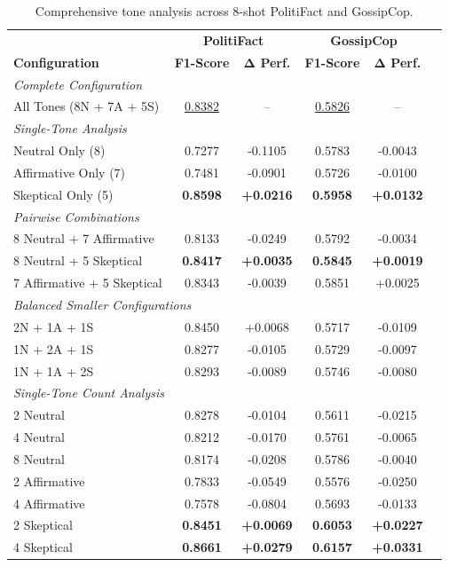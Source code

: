 \begin{table}[htbp]
\centering
\caption{Comprehensive tone analysis across 8-shot PolitiFact and GossipCop.}
\label{tab:comprehensive_tone_analysis}
\begin{tabular}{lccccc}
\toprule
& \multicolumn{2}{c}{\textbf{PolitiFact}} & \multicolumn{2}{c}{\textbf{GossipCop}} \\
\cmidrule(lr){2-3} \cmidrule(lr){4-5}
\textbf{Configuration} & \textbf{F1-Score} & \textbf{Δ Perf.} & \textbf{F1-Score} & \textbf{Δ Perf.} \\
\midrule
\multicolumn{5}{l}{\textit{Complete Configuration}} \\
All Tones (8N + 7A + 5S) & \underline{0.8382} & -- & \underline{0.5826} & -- \\
\midrule
\multicolumn{5}{l}{\textit{Single-Tone Analysis}} \\
Neutral Only (8) & 0.7277 & -0.1105 & 0.5783 & -0.0043 \\
Affirmative Only (7) & 0.7481 & -0.0901 & 0.5726 & -0.0100 \\
Skeptical Only (5) & \textbf{0.8598} & \textbf{+0.0216} & \textbf{0.5958} & \textbf{+0.0132} \\
\midrule
\multicolumn{5}{l}{\textit{Pairwise Combinations}} \\
8 Neutral + 7 Affirmative & 0.8133 & -0.0249 & 0.5792 & -0.0034 \\
8 Neutral + 5 Skeptical & \textbf{0.8417} & \textbf{+0.0035} & \textbf{0.5845} & \textbf{+0.0019} \\
7 Affirmative + 5 Skeptical & 0.8343 & -0.0039 & 0.5851 & +0.0025 \\
\midrule
\multicolumn{5}{l}{\textit{Balanced Smaller Configurations}} \\
2N + 1A + 1S & 0.8450 & +0.0068 & 0.5717 & -0.0109 \\
1N + 2A + 1S & 0.8277 & -0.0105 & 0.5729 & -0.0097 \\
1N + 1A + 2S & 0.8293 & -0.0089 & 0.5746 & -0.0080 \\
\midrule
\multicolumn{5}{l}{\textit{Single-Tone Count Analysis}} \\
2 Neutral     & 0.8278 & -0.0104 & 0.5611 & -0.0215 \\
4 Neutral     & 0.8212 & -0.0170 & 0.5761 & -0.0065 \\
8 Neutral     & 0.8174 & -0.0208 & 0.5786 & -0.0040 \\ 
2 Affirmative & 0.7833 & -0.0549 & 0.5576 & -0.0250 \\
4 Affirmative & 0.7578 & -0.0804 & 0.5693 & -0.0133 \\
2 Skeptical   & \textbf{0.8451} & \textbf{+0.0069} & \textbf{0.6053} & \textbf{+0.0227} \\
4 Skeptical   & \textbf{0.8661} & \textbf{+0.0279} & \textbf{0.6157} & \textbf{+0.0331} \\
\bottomrule
\end{tabular}
\end{table}

